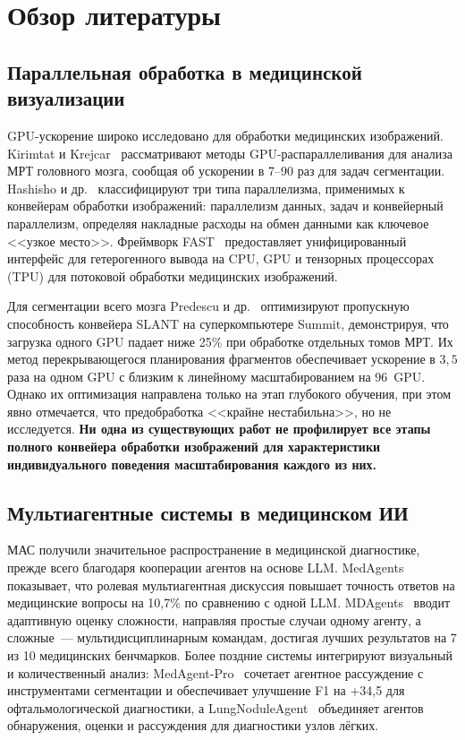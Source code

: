 \documentclass[conference]{IEEEtran}
\begin{document}
\section{Обзор литературы}

\subsection{Параллельная обработка в медицинской визуализации}

GPU-ускорение широко исследовано для обработки медицинских изображений. Kirimtat и Krejcar~\cite{kirimtat2024} рассматривают методы GPU-распараллеливания для анализа МРТ головного мозга, сообщая об ускорении в 7--90 раз для задач сегментации. Hashisho и др.~\cite{hashisho2024} классифицируют три типа параллелизма, применимых к конвейерам обработки изображений: параллелизм данных, задач и конвейерный параллелизм, определяя накладные расходы на обмен данными как ключевое <<узкое место>>. Фреймворк FAST~\cite{smistad2019} предоставляет унифицированный интерфейс для гетерогенного вывода на CPU, GPU и тензорных процессорах (TPU) для потоковой обработки медицинских изображений.

Для сегментации всего мозга Predescu и др.~\cite{predescu2024} оптимизируют пропускную способность конвейера SLANT на суперкомпьютере Summit, демонстрируя, что загрузка одного GPU падает ниже 25\% при обработке отдельных томов МРТ. Их метод перекрывающегося планирования фрагментов обеспечивает ускорение в $3{,}5$ раза на одном GPU с близким к линейному масштабированием на 96~GPU. Однако их оптимизация направлена только на этап глубокого обучения, при этом явно отмечается, что предобработка <<крайне нестабильна>>, но не исследуется. \textbf{Ни одна из существующих работ не профилирует все этапы полного конвейера обработки изображений для характеристики индивидуального поведения масштабирования каждого из них.}

\subsection{Мультиагентные системы в медицинском ИИ}

МАС получили значительное распространение в медицинской диагностике, прежде всего благодаря кооперации агентов на основе LLM. MedAgents~\cite{tang2024} показывает, что ролевая мультиагентная дискуссия повышает точность ответов на медицинские вопросы на 10,7\% по сравнению с одной LLM. MDAgents~\cite{kim2024} вводит адаптивную оценку сложности, направляя простые случаи одному агенту, а сложные~--- мультидисциплинарным командам, достигая лучших результатов на 7 из 10 медицинских бенчмарков. Более поздние системы интегрируют визуальный и количественный анализ: MedAgent-Pro~\cite{wang2025} сочетает агентное рассуждение с инструментами сегментации и обеспечивает улучшение F1 на +34,5 для офтальмологической диагностики, а LungNoduleAgent~\cite{yang2026} объединяет агентов обнаружения, оценки и рассуждения для диагностики узлов лёгких.
\end{document}
